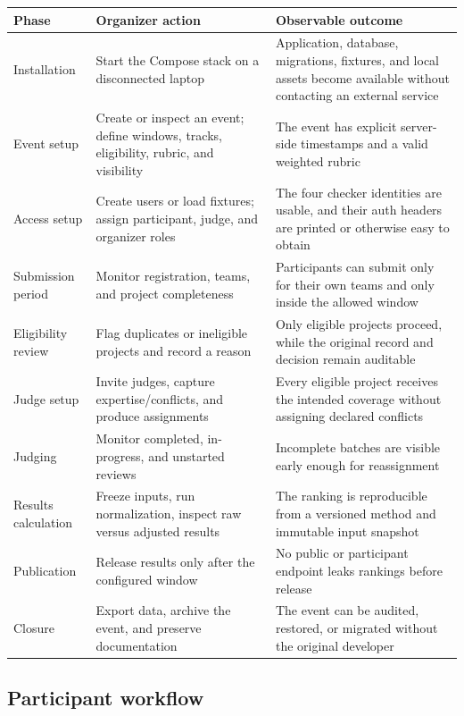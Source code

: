 \documentclass[11pt]{article}
\begin{document}
\begin{longtable}{@{}L{31mm}L{42mm}L{84mm}@{}}
\toprule
\textbf{Phase} & \textbf{Organizer action} & \textbf{Observable outcome}\\
\midrule
\endhead%
Installation & Start the Compose stack on a disconnected laptop & Application, database, migrations, fixtures, and local assets become available without contacting an external service\\
Event setup & Create or inspect an event; define windows, tracks, eligibility, rubric, and visibility & The event has explicit server-side timestamps and a valid weighted rubric\\
Access setup & Create users or load fixtures; assign participant, judge, and organizer roles & The four checker identities are usable, and their auth headers are printed or otherwise easy to obtain\\
Submission period & Monitor registration, teams, and project completeness & Participants can submit only for their own teams and only inside the allowed window\\
Eligibility review & Flag duplicates or ineligible projects and record a reason & Only eligible projects proceed, while the original record and decision remain auditable\\
Judge setup & Invite judges, capture expertise/conflicts, and produce assignments & Every eligible project receives the intended coverage without assigning declared conflicts\\
Judging & Monitor completed, in-progress, and unstarted reviews & Incomplete batches are visible early enough for reassignment\\
Results calculation & Freeze inputs, run normalization, inspect raw versus adjusted results & The ranking is reproducible from a versioned method and immutable input snapshot\\
Publication & Release results only after the configured window & No public or participant endpoint leaks rankings before release\\
Closure & Export data, archive the event, and preserve documentation & The event can be audited, restored, or migrated without the original developer\\
\bottomrule
\end{longtable}

\subsection{Participant workflow}
\end{document}
